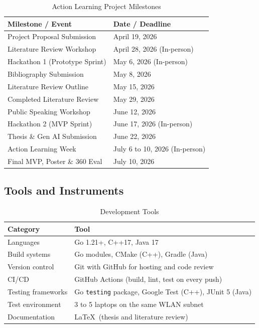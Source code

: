 \begin{table}[htbp]
\centering
\caption{Action Learning Project Milestones}
\label{tab:milestones}
\begin{tabular}{p{4.5cm} p{8.5cm}}
\toprule
\textbf{Milestone / Event} & \textbf{Date / Deadline} \\
\midrule
Project Proposal Submission & April 19, 2026 \\
\midrule
Literature Review Workshop & April 28, 2026 (In-person) \\
\midrule
Hackathon 1 (Prototype Sprint) & May 6, 2026 (In-person) \\
\midrule
Bibliography Submission & May 8, 2026 \\
\midrule
Literature Review Outline & May 15, 2026 \\
\midrule
Completed Literature Review & May 29, 2026 \\
\midrule
Public Speaking Workshop & June 12, 2026 \\
\midrule
Hackathon 2 (MVP Sprint) & June 17, 2026 (In-person) \\
\midrule
Thesis \& Gen AI Submission & June 22, 2026 \\
\midrule
Action Learning Week & July 6 to 10, 2026 (In-person) \\
\midrule
Final MVP, Poster \& 360 Eval & July 10, 2026 \\
\bottomrule
\end{tabular}
\end{table}

\subsection{Tools and Instruments}

\begin{table}[htbp]
\centering
\caption{Development Tools}
\label{tab:tools}
\begin{tabular}{p{4cm} p{9cm}}
\toprule
\textbf{Category} & \textbf{Tool} \\
\midrule
Languages & Go 1.21+, C++17, Java 17 \\
\midrule
Build systems & Go modules, CMake (C++), Gradle (Java) \\
\midrule
Version control & Git with GitHub for hosting and code review \\
\midrule
CI/CD & GitHub Actions (build, lint, test on every push) \\
\midrule
Testing frameworks & Go \texttt{testing} package, Google Test (C++), JUnit 5 (Java) \\
\midrule
Test environment & 3 to 5 laptops on the same WLAN subnet \\
\midrule
Documentation & \LaTeX\ (thesis and literature review) \\
\bottomrule
\end{tabular}
\end{table}

